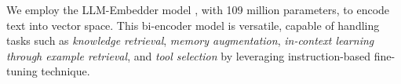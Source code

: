\documentclass[runningheads]{llncs}
\begin{document}


We employ the LLM-Embedder model \cite{DBLP:journals/corr/abs-2310-07554}, with 109 million parameters, to encode text into vector space. This bi-encoder model is versatile, capable of handling tasks such as \textit{knowledge retrieval}, \textit{memory augmentation}, \textit{in-context learning through example retrieval}, and \textit{tool selection} by leveraging instruction-based fine-tuning technique.
\end{document}
